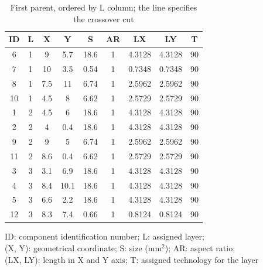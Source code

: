 \begin{table}[pt]
\caption{First parent, ordered by L column; the line specifies the crossover cut}
\begin{center}
\begin{scriptsize}
\begin{tabular}{|c|c|c|c|c|c|c|c|c|}
\hline ID & L & X & Y & S & AR & LX & LY & T\\
\hline 6 & 1 & 9 & 5.7 & 18.6 & 1 & 4.3128 & 4.3128 & 90\\
7 & 1 & 10 & 3.5 & 0.54 & 1 & 0.7348 & 0.7348 & 90\\
8 & 1 & 7.5 & 11 & 6.74 & 1 & 2.5962 & 2.5962 & 90\\
10 & 1 & 4.5 & 8 & 6.62 & 1 & 2.5729 & 2.5729 & 90\\
1 & 2 & 4.5 & 6 & 18.6 & 1 & 4.3128 & 4.3128 & 90\\
2 & 2 & 4 & 0.4 & 18.6 & 1 & 4.3128 & 4.3128 & 90\\
9 & 2 & 9 & 5 & 6.74 & 1 & 2.5962 & 2.5962 & 90\\
\hline
\hline
11 & 2 & 8.6 & 0.4 & 6.62 & 1 & 2.5729 & 2.5729 & 90\\
3 & 3 & 3.1 & 6.9 & 18.6 & 1 & 4.3128 & 4.3128 & 90\\
4 & 3 & 8.4 & 10.1 & 18.6 & 1 & 4.3128 & 4.3128 & 90\\
5 & 3 & 6.6 & 2.2 & 18.6 & 1 & 4.3128 & 4.3128 & 90\\
12 & 3 & 8.3 & 7.4 & 0.66 & 1 & 0.8124 & 0.8124 & 90\\
\hline
\end{tabular}
\end{scriptsize}
\end{center}
\begin{center}
\begin{scriptsize}
ID: component identification number; L: assigned layer;\\
(X, Y): geometrical coordinate; S: size (mm$^2$); AR: aspect ratio;\\
(LX, LY): length in X and Y axis; T: assigned technology for the layer
\end{scriptsize}
\end{center}
\label{tab:firstparentLrow}
\end{table}


